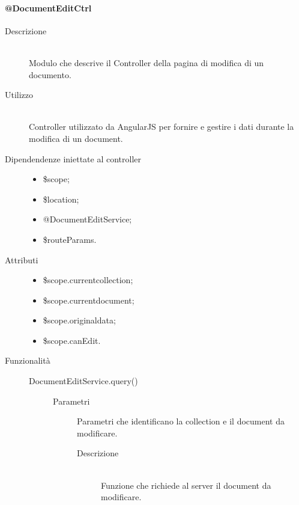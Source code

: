 \paragraph{@DocumentEditCtrl}
\begin{description}
 \item[Descrizione] \hfill \\
 Modulo che descrive il Controller della pagina di modifica di un documento.
 
 \item[Utilizzo] \hfill \\
 Controller utilizzato da AngularJS per fornire e gestire i dati durante la modifica di un document.
 
 \item[Dipendendenze iniettate al controller] \hfill
 \begin{itemize}
  \item \$scope;
  \item \$location;
  \item @DocumentEditService;
  \item \$routeParams.
  
 \end{itemize}
 
 \item[Attributi] \hfill
 \begin{itemize}
 	\item  \$scope.current\textunderscore collection;
    \item  \$scope.current\textunderscore document;
    \item  \$scope.original\textunderscore data;
    \item  \$scope.canEdit.
 \end{itemize}
 
 \item[Funzionalità] \hfill
 \begin{description}
  \item[DocumentEditService.query()] \hfill
   \begin{description}
  	\item[Parametri]
  		\begin{mldescription}
       
        Parametri che identificano la collection e il document da modificare.
  		\end{mldescription}
  	\begin{description}
  	\item[Descrizione] \hfill \\
	Funzione che richiede al server il document da modificare.
	\end{description}
  \end{description}
 

\end{description}
\end{description}
